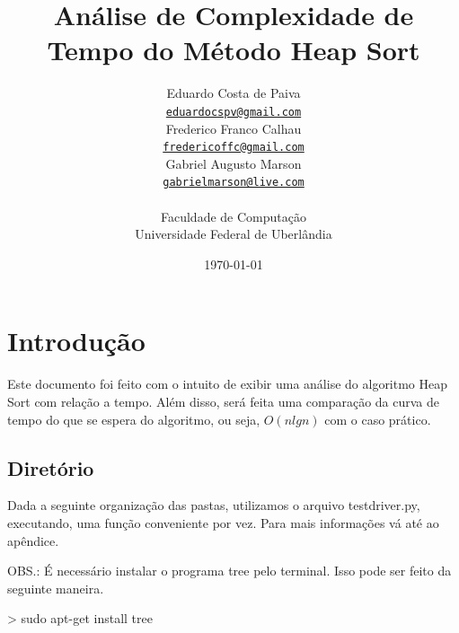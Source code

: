 \documentclass[12pt,a4paper,twoside]{report}
\title{Análise de Complexidade de Tempo do Método Heap Sort}
\date{}
\author{Eduardo Costa de Paiva \\
\texttt{\small \url{eduardocspv@gmail.com}}\\
Frederico Franco Calhau \\
\texttt{\small \url{fredericoffc@gmail.com}}\\
Gabriel Augusto Marson \\
\texttt{\small \url{gabrielmarson@live.com}}\\
\vspace{1cm} \\
Faculdade de Computação \\
Universidade Federal de Uberlândia
}
\date{\today}
\begin{document}
  \maketitle
\listoffigures            
\listoftables            
\lstlistoflistings

\tableofcontents    


\fancyhead[RE,LO]{\thesection}

\setlength{\parskip}{0.15in} %

\chapter{Introdução}
Este documento foi feito com o intuito de exibir uma análise do algoritmo Heap Sort 
com relação a tempo. Além disso, será feita uma comparação da curva de tempo do que se espera do
algoritmo, ou seja, $O(n lg n)$ com o caso prático. 

\section{Diretório}

Dada a seguinte organização das pastas, utilizamos o arquivo testdriver.py,  executando, uma função conveniente por vez. Para mais informações vá até ao apêndice.

OBS.: É necessário instalar o programa tree pelo terminal. Isso pode ser feito da seguinte maneira.

\begin{terminal}
> sudo apt-get install tree
\end{terminal}
\end{document}
